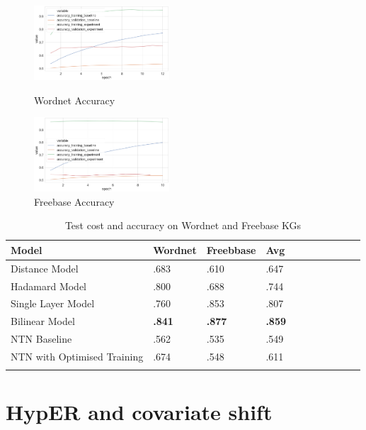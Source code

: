 \begin{figure}[H]
	\parbox{.5\linewidth}{
   		\centering
    		\includegraphics[width=0.45\textwidth, height=0.2\textheight]{Wordnet_Accuracy_Results_Early_Stopping}
		\caption{Wordnet Accuracy}
		}
	\hfill
	\parbox{.5\linewidth}{
   		\centering
		\includegraphics[width=0.45\textwidth, height=0.2\textheight]{Freebase_Accuracy_Results}
		\caption{Freebase Accuracy}
		}
\end{figure}

\begin{table}[H]
	\centering
	\begin{tabular}{lllllllllll}
  		\textbf{Model} & \textbf{Wordnet} & \textbf{Freebbase} & \textbf{Avg} \\
  		\hline
  		Distance Model & .683 & .610 & .647 \\
  		Hadamard Model & .800 & .688 & .744 \\
  		Single Layer Model & .760 & .853 & .807 \\
  		Bilinear Model & \textbf{.841} & \textbf{.877} & \textbf{.859} \\
  		NTN Baseline & .562 & .535 & .549 \\
  		\hline
  		NTN with Optimised Training & .674 & .548 & .611 \\
		&
	\end{tabular}
	\caption{Test cost and accuracy on Wordnet and Freebase KGs}
\end{table}



\section{HypER and covariate shift}

